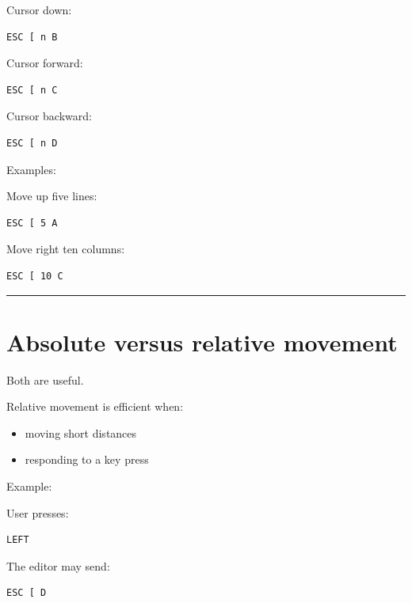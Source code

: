 \documentclass[
  oneside,
  openany]{book}
\providecommand{\tightlist}{%
  \setlength{\itemsep}{0pt}\setlength{\parskip}{0pt}}
\begin{document}
Cursor down:

\begin{verbatim}
ESC [ n B
\end{verbatim}

Cursor forward:

\begin{verbatim}
ESC [ n C
\end{verbatim}

Cursor backward:

\begin{verbatim}
ESC [ n D
\end{verbatim}

Examples:

Move up five lines:

\begin{verbatim}
ESC [ 5 A
\end{verbatim}

Move right ten columns:

\begin{verbatim}
ESC [ 10 C
\end{verbatim}

\begin{center}\rule{0.5\linewidth}{0.5pt}\end{center}

\hypertarget{absolute-versus-relative-movement}{%
\section{Absolute versus relative
movement}\label{absolute-versus-relative-movement}}

Both are useful.

Relative movement is efficient when:

\begin{itemize}
\tightlist
\item
  moving short distances
\item
  responding to a key press
\end{itemize}

Example:

User presses:

\begin{verbatim}
LEFT
\end{verbatim}

The editor may send:

\begin{verbatim}
ESC [ D
\end{verbatim}
\end{document}
